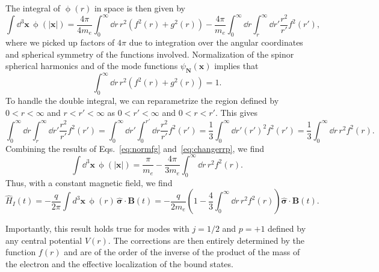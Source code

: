 \documentclass[letterpaper,12pt,titlepage,oneside,final]{book}
\begin{document}
The integral of $\upphi(r)$ in space is then given by
\begin{equation}
    \int \dd^3 \bm x \, \upphi(|\bm x|) = \frac{4\pi}{4m_e} \int_0^\infty \dd r \, r^2 (f^2(r) + g^2(r)) - \frac{4\pi}{m_e}\int_0^\infty \dd r  \int_r^\infty  \dd r'\frac{r^2}{r'} f^2(r'),
\end{equation}
where we picked up factors of $4\pi$ due to integration over the angular coordinates and spherical symmetry of the functions involved. Normalization of the spinor spherical harmonics and of the mode functions $\psi_{\bm N}(\bm x)$ implies that
\begin{equation}\label{eq:normfg}
    \int_0^\infty \dd r \, r^2 (f^2(r) + g^2(r)) = 1.
\end{equation}
To handle the double integral, we can reparametrize the region defined by $0<r<\infty$ and $r<r'<\infty$ as $0<r'<\infty$ and $0<r<r'$. This gives
\begin{equation}\label{eq:changerrp}
    \int_0^\infty \dd r  \int_r^\infty  \dd r'\frac{r^2}{r'} f^2(r') = \int_0^\infty \dd r'  \int_0^{r'}  \dd r\frac{r^2}{r'} f^2(r') = \frac{1}{3}\int_0^\infty \dd r' (r')^2 f^2(r') = \frac{1}{3}\int_0^\infty \dd r\, r^2 f^2(r).
\end{equation}
Combining the results of Eqs.~\eqref{eq:normfg} and~\eqref{eq:changerrp}, we find
\begin{equation}
    \int \dd^3 \bm x \, \upphi(|\bm x|) = \frac{\pi}{m_e} - \frac{4\pi}{3m_e}\int_0^\infty \dd r\, r^2 f^2(r).
\end{equation}
Thus, with a constant magnetic field, we find
\begin{equation}
    \hat{H}_I(t) = - \frac{q}{2\pi} \int d^3\bm x\, \upphi(r)\, \hat{\bm{\sigma}}\cdot\bm{B}(t) = - \frac{q}{2m_e}\left(1 - \frac{4}{3}\int_0^\infty \dd r\, r^2 f^2(r)\right)\hat{\bm{\sigma}}\cdot\bm{B}(t).
\end{equation}

Importantly, this result holds true for modes with $j=1/2$ and $p=+1$ defined by any central potential $V(r)$. The corrections are then entirely determined by the function $f(r)$ and are of the order of the inverse of the product of the mass of the electron and the effective localization of the bound states.
\end{document}
